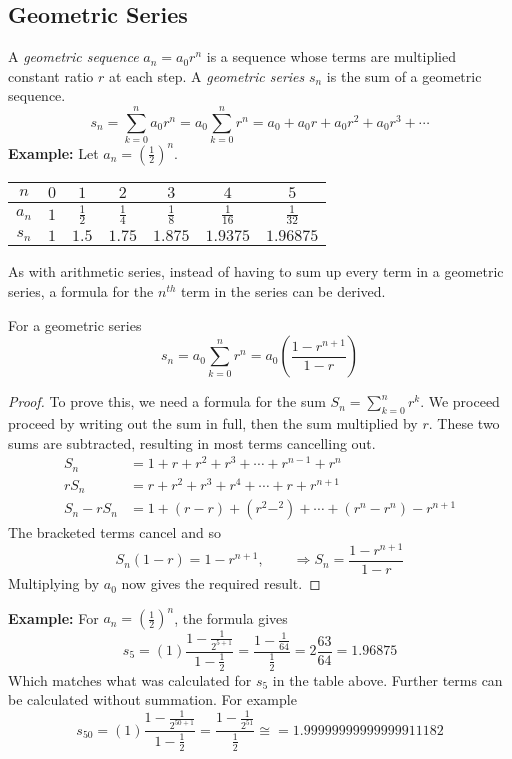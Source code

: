\documentclass[12pt]{article}
\begin{document}
\subsection*{Geometric Series}
A \emph{geometric sequence} $a_n=a_0 r^n$ is a sequence whose terms are multiplied constant ratio $r$ at each step. A \emph{geometric series} $s_n$ is the sum of a geometric sequence.
\begin{equation*}
  s_n=\sum_{k=0}^n a_0 r^n =  a_0 \sum_{k=0}^n r^n = a_0 + a_0r +a_0 r^2+a_0 r^3 + \cdots 
\end{equation*}
\noindent \textbf{Example:} Let $a_n=\left(\frac{1}{2}\right)^n$.
\begin{center}
\begin{tabular}{c|c|c|c|c|c|c}
$n$ & $0$ & $1$ & $2$ & $3$ & $4$ & $5$   \\ \hline
$a_n$ & $1$ & $\frac{1}{2}$ & $\frac{1}{4}$ & $\frac{1}{8}$ & $\frac{1}{16}$ & $\frac{1}{32}$  \\ \hline
$s_n$ & $1$ & $1.5$ & $1.75$ & $1.875$ & $1.9375$ & $1.96875$ 
\end{tabular}
\end{center}
As with arithmetic series, instead of having to sum up every term in a geometric series, a formula for the $n^{th}$ term in the series can be derived.
\begin{thm*}
  For a geometric series
  \begin{equation*}
    s_n = a_0 \sum_{k=0}^n r^n= a_0 \left( \frac{1-r^{n+1}}{1-r} \right)
  \end{equation*}
\begin{proof}
To prove this, we need a formula for the sum $S_n=\sum_{k=0}^n r^k$. We proceed proceed by writing out the sum in full, then the sum multiplied by $r$. These two sums are subtracted, resulting in most terms cancelling out.
  \begin{align*}
    S_n&=1+r+r^2+r^3+\cdots+r^{n-1}+r^n\\
    r S_n&=r+r^2+r^3+r^4+\cdots+r+r^{n+1}\\
    S_n-r S_n&= 1 + (r - r) + (r^2-^2)+\cdots+(r^n-r^n)-r^{n+1}
  \end{align*}
The bracketed terms cancel and so
\begin{equation*}
  S_n(1-r)=1 -r^{n+1}, \qquad \Rightarrow S_n=\frac{1-r^{n+1}}{1-r}
\end{equation*}
Multiplying by $a_0$ now gives the required result.
\end{proof}
\end{thm*}
\noindent  \textbf{Example:}
For $a_n=\left(\frac{1}{2}\right)^n$, the formula gives
\begin{equation*}
  s_5=(1)\frac{1-\frac{1}{2^{5+1}}}{1-\frac{1}{2}}=\frac{1-\frac{1}{64}}{\frac{1}{2}}=2\frac{63}{64}=1.96875
\end{equation*}
Which matches what was calculated for $s_5$ in the table above. Further terms can be calculated without summation. For example
\begin{equation*}
  s_{50}=(1)\frac{1-\frac{1}{2^{50+1}}}{1-\frac{1}{2}}=\frac{1-\frac{1}{2^{51}}}{\frac{1}{2}} \cong=1.99999999999999911182
\end{equation*}

\end{document}
